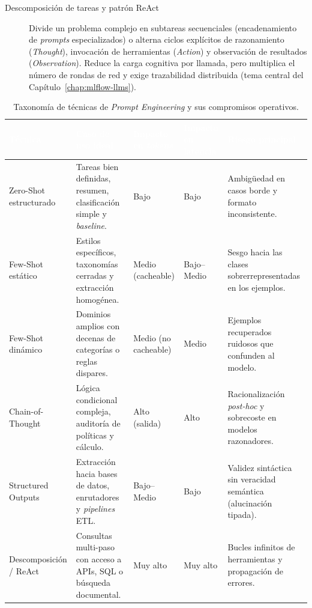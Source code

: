 \begin{description}
  \item[Descomposición de tareas y patrón ReAct] Divide un problema complejo en subtareas secuenciales (encadenamiento de \textit{prompts} especializados) o alterna ciclos explícitos de razonamiento (\textit{Thought}), invocación de herramientas (\textit{Action}) y observación de resultados (\textit{Observation}). Reduce la carga cognitiva por llamada, pero multiplica el número de rondas de red y exige trazabilidad distribuida (tema central del Capítulo~\ref{chap:mlflow-llms}).
\end{description}

\begin{table}[htbp]
\centering
\caption{Taxonomía de técnicas de \textit{Prompt Engineering} y sus compromisos operativos.}
\label{tab:taxonomia-prompting}
\small
\begin{tabularx}{\textwidth}{@{}L{2.9cm} Y C{2.1cm} C{2.1cm} L{2.8cm}@{}}
\toprule
{}
\textcolor{white}{\sffamily\bfseries Técnica} &
\textcolor{white}{\sffamily\bfseries Caso de uso ideal} &
\textcolor{white}{\sffamily\bfseries Impacto en \textit{tokens}} &
\textcolor{white}{\sffamily\bfseries Impacto en latencia} &
\textcolor{white}{\sffamily\bfseries Riesgo principal} \\
\midrule
Zero-Shot estructurado &
Tareas bien definidas, resumen, clasificación simple y \textit{baseline}. &
Bajo &
Bajo &
Ambigüedad en casos borde y formato inconsistente. \\
Few-Shot estático &
Estilos específicos, taxonomías cerradas y extracción homogénea. &
Medio (cacheable) &
Bajo--Medio &
Sesgo hacia las clases sobrerrepresentadas en los ejemplos. \\
Few-Shot dinámico &
Dominios amplios con decenas de categorías o reglas dispares. &
Medio (no cacheable) &
Medio &
Ejemplos recuperados ruidosos que confunden al modelo. \\
Chain-of-Thought &
Lógica condicional compleja, auditoría de políticas y cálculo. &
Alto (salida) &
Alto &
Racionalización \textit{post-hoc} y sobrecoste en modelos razonadores. \\
Structured Outputs &
Extracción hacia bases de datos, enrutadores y \textit{pipelines} ETL. &
Bajo--Medio &
Bajo &
Validez sintáctica sin veracidad semántica (alucinación tipada). \\
Descomposición / ReAct &
Consultas multi-paso con acceso a APIs, SQL o búsqueda documental. &
Muy alto &
Muy alto &
Bucles infinitos de herramientas y propagación de errores. \\
\bottomrule
\end{tabularx}
\end{table}

